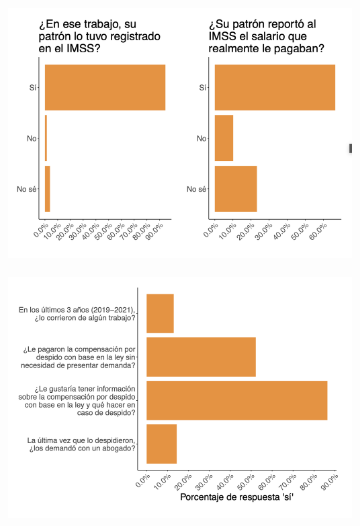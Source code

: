 \documentclass[oneside,11pt]{article}
\begin{document}
\begin{figure}[H]
\begin{center}
    \begin{subfigure}{0.49\textwidth}
    \includegraphics[width=\textwidth]{04_Figures/workey_survey/Exp_3.png}
    \end{subfigure}
    \begin{subfigure}{0.49\textwidth}
    \includegraphics[width=\textwidth]{04_Figures/workey_survey/Exp_4.png}
    \end{subfigure}
    

\end{center}
\end{figure}
\end{document}
